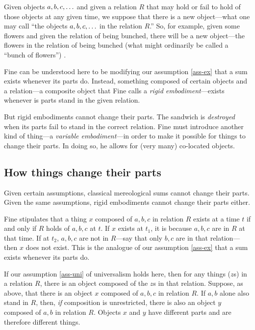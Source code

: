 \documentclass[11pt]{article}
\newenvironment{squote}{%
\begin{spacing}{1}
\begin{list}{}{%
\setlength{\labelwidth}{0pt}%
\rightmargin\leftmargin%
}
\item\relax
}{%
\end{list}%
\end{spacing}
}
\begin{document}
\begin{spacing}{1.5}
\begin{squote}
Given objects $a, b, c, \mathellipsis $ and given a relation $R$ that
may hold or fail to hold of those objects at any given time, we
suppose that there is a new object---what one may call ``the objects
$a, b, c, \mathellipsis $ in the relation $R$.''  So, for example,
given some flowers and given the relation of being bunched, there will
be a new object---the flowers in the relation of being bunched (what
might ordinarily be called a ``bunch of flowers'')
\citeyearpar[65]{fine1999}.
\end{squote}

Fine can be understood here to be modifying our assumption
\ref{ass-ex} that a sum exists whenever its parts do.  Instead,
something composed of certain objects and a relation---a composite
object that Fine calls a {\em rigid embodiment}---exists whenever is
parts stand in the given relation.

But rigid embodiments cannot change their parts.  The sandwich is {\em
  destroyed} when its parts fail to stand in the correct relation.
Fine must introduce another kind of thing---a {\em variable
  embodiment}---in order to make it possible for things to change
their parts.  In doing so, he allows for (very many) co-located
objects.

\subsection{How things change their parts}
\label{h-part}
Given certain assumptions, classical mereological sums cannot change
their parts.  Given the same assumptions, rigid embodiments cannot
change their parts either.

Fine stipulates that a thing $x$ composed of $a, b, c$ in relation $R$
exists at a time $t$ if and only if $R$ holds of $a, b, c$ at $t$.  If
$x$ exists at $t_1$, it is because $a, b, c$ are in $R$ at that time.
If at $t_2$, $a, b, c$ are not in $R$---say that only $b, c$ are in
that relation---then $x$ does not exist.  This is the analogue of our
assumption \ref{ass-ex} that a sum exists whenever its parts do.

If our assumption \ref{ass-uni} of universalism holds here, then for
any things ($z$s) in a relation $R$, there is an object composed of
the $z$s in that relation.  Suppose, as above, that there is an object
$x$ composed of $a, b, c$ in relation $R$.  If $a, b$ alone also stand
in $R$, then, {\em if} composition is unrestricted, there is also an
object $y$ composed of $a, b$ in relation $R$.  Objects $x$ and $y$
have different parts and are therefore different things.


\end{spacing}
\end{document}
